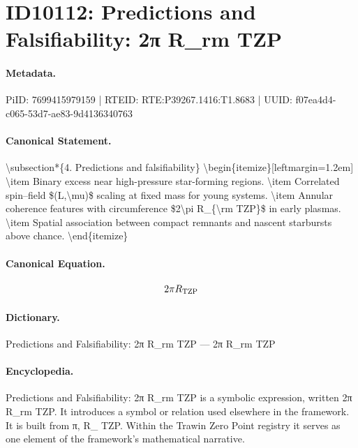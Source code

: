 \section*{ID10112: Predictions and Falsifiability: 2π R\_rm TZP}
\paragraph{Metadata.}
PiID: 7699415979159 | RTEID: RTE:P39267.1416:T1.8683 | UUID: f07ea4d4-c065-53d7-ae83-9d4136340763

\paragraph{Canonical Statement.}
\textbackslash{}subsection*\{4. Predictions and falsifiability\} \textbackslash{}begin\{itemize\}[leftmargin=1.2em] \textbackslash{}item Binary excess near high-pressure star-forming regions. \textbackslash{}item Correlated spin--field \$(L,\textbackslash{}mu)\$ scaling at fixed mass for young systems. \textbackslash{}item Annular coherence features with circumference \$2\textbackslash{}pi R\_\{\textbackslash{}rm TZP\}\$ in early plasmas. \textbackslash{}item Spatial association between compact remnants and nascent starbursts above chance. \textbackslash{}end\{itemize\}

\paragraph{Canonical Equation.}
\[
2\pi R_{\rm TZP}
\]

\paragraph{Dictionary.}
Predictions and Falsifiability: 2π R\_rm TZP — 2π R\_rm TZP

\paragraph{Encyclopedia.}
Predictions and Falsifiability: 2π R\_rm TZP is a symbolic expression, written 2π R\_rm TZP. It introduces a symbol or relation used elsewhere in the framework. It is built from π, R\_ TZP. Within the Trawin Zero Point registry it serves as one element of the framework's mathematical narrative.

